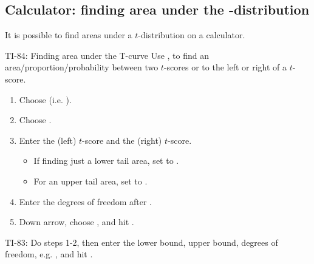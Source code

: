 \D{\newpage}

\subsection[Calculator: finding area under the $t$-distribution]{Calculator: finding area under the -distribution}

It is possible to find areas under a $t$-distribution on a calculator.

\begin{onebox}{TI-84: Finding area under the T-curve}
Use  ,  to find an area/proportion/probability between two $t$-scores or to the left or right of a $t$-score.\vspace{-1mm}
\begin{enumerate}
\setlength{\itemsep}{0mm}
\item Choose   (i.e. ).
\item Choose .
\item Enter the  (left) $t$-score and the  (right) $t$-score.
\vspace{-1.5mm}
  \begin{itemize}
  \setlength{\itemsep}{0mm}
  \item If finding just a lower tail area, set  to .
  \item For an upper tail area, set  to .
\end{itemize}
\item Enter the degrees of freedom after .
\item Down arrow, choose , and hit .\vspace{-1.5mm}
\end{enumerate}
TI-83: Do steps 1-2, then enter the lower bound, upper bound, degrees of freedom, e.g. , and hit .\end{onebox}

